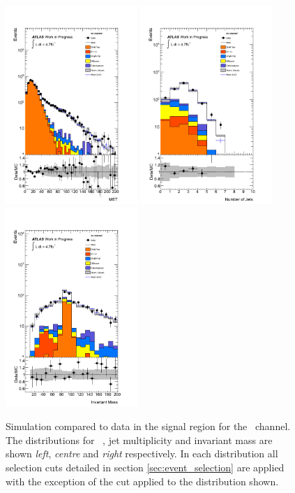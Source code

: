 \begin{figure}[htbp!]
     \begin{center}
     \includegraphics[width=50mm]{f/ee_control_sig_met_central_double}
     \includegraphics[width=50mm]{f/ee_control_sig_njet_central_double}
     \includegraphics[width=50mm]{f/ee_inv_mass_central_double}
     \end{center}
     \caption{Simulation compared to data in the signal region for the \ee\ channel. The distributions for \etmiss\ , jet multiplicity and invariant mass are shown \emph{left}, \emph{centre} and \emph{right} respectively. In each distribution all selection cuts detailed in section \ref{sec:event_selection} are applied with the exception of the cut applied to the distribution shown.}
     \label{fig:dilep_control_sig_ee}
    \end{figure}

